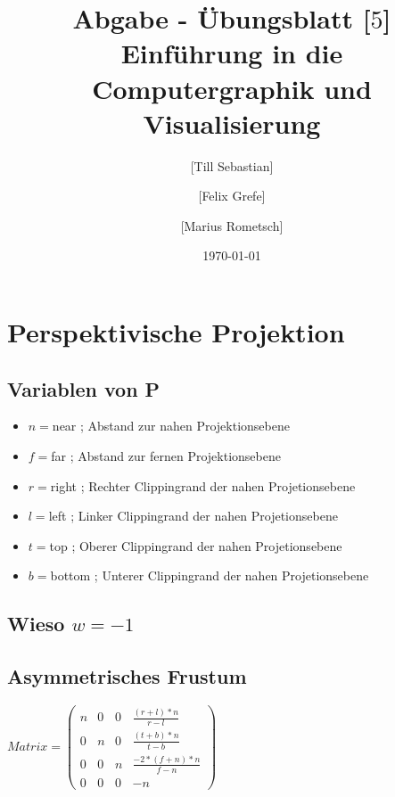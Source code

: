 \documentclass[10pt,a4paper]{article}
\begin{document}
\title{Abgabe - Übungsblatt [$5$]\\
\small{Einführung in die Computergraphik und Visualisierung}}
\author{ [Till Sebastian] \and [Felix Grefe] \and [Marius Rometsch]}
\date{\today}
\maketitle

\section{Perspektivische Projektion}
\subsection{Variablen von P}
\begin{itemize}
\item $n=$near ; Abstand zur nahen Projektionsebene
\item $f=$far ; Abstand zur fernen Projektionsebene
\item $r=$right ; Rechter Clippingrand der nahen Projetionsebene
\item $l=$left ; Linker Clippingrand der nahen Projetionsebene
\item $t=$top ; Oberer Clippingrand der nahen Projetionsebene
\item $b=$bottom ; Unterer Clippingrand der nahen Projetionsebene
\end{itemize}


\subsection{Wieso $w=-1$}

\subsection{Asymmetrisches Frustum}
$
Matrix =\begin{pmatrix}
n & 0 & 0 & \frac{(r+l)*n}{r-l} \\
0 & n & 0 & \frac{(t+b)*n}{t-b} \\
0 & 0 & n & \frac{-2*(f+n)*n}{f-n}\\
0 & 0 & 0 & -n

\end{pmatrix}
$
\end{document}
